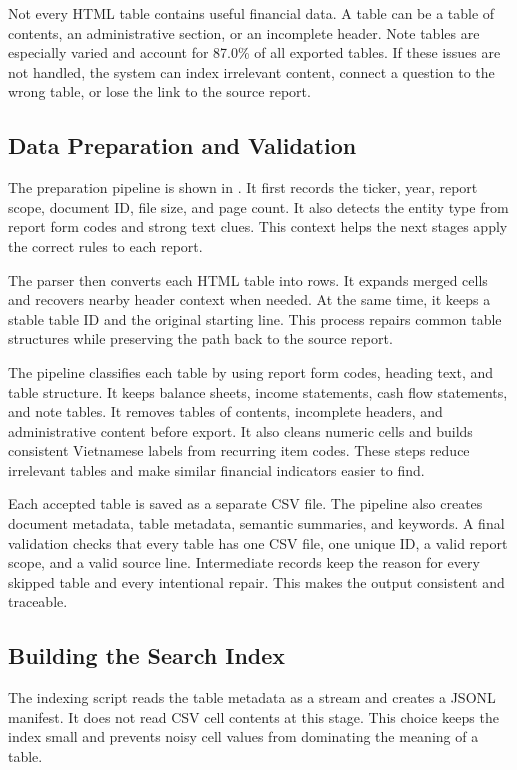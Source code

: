 \documentclass[10pt,journal,compsoc]{IEEEtran}
\begin{document}
Not every HTML table contains useful financial data. A table can be a table of contents, an administrative section, or an incomplete header. Note tables are especially varied and account for 87.0\% of all exported tables. If these issues are not handled, the system can index irrelevant content, connect a question to the wrong table, or lose the link to the source report.

\subsection{Data Preparation and Validation}
The preparation pipeline is shown in . It first records the ticker, year, report scope, document ID, file size, and page count. It also detects the entity type from report form codes and strong text clues. This context helps the next stages apply the correct rules to each report.

The parser then converts each HTML table into rows. It expands merged cells and recovers nearby header context when needed. At the same time, it keeps a stable table ID and the original starting line. This process repairs common table structures while preserving the path back to the source report.

The pipeline classifies each table by using report form codes, heading text, and table structure. It keeps balance sheets, income statements, cash flow statements, and note tables. It removes tables of contents, incomplete headers, and administrative content before export. It also cleans numeric cells and builds consistent Vietnamese labels from recurring item codes. These steps reduce irrelevant tables and make similar financial indicators easier to find.

Each accepted table is saved as a separate CSV file. The pipeline also creates document metadata, table metadata, semantic summaries, and keywords. A final validation checks that every table has one CSV file, one unique ID, a valid report scope, and a valid source line. Intermediate records keep the reason for every skipped table and every intentional repair. This makes the output consistent and traceable.

\subsection{Building the Search Index}
The indexing script reads the table metadata as a stream and creates a JSONL manifest. It does not read CSV cell contents at this stage. This choice keeps the index small and prevents noisy cell values from dominating the meaning of a table.
\end{document}
